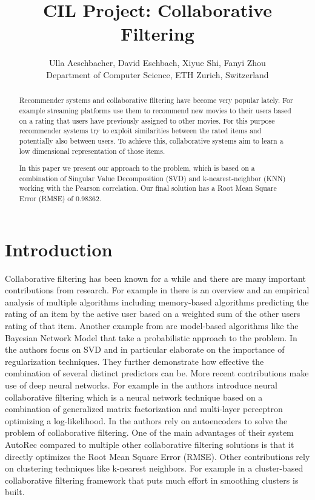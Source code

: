 \documentclass[10pt,conference,compsocconf]{IEEEtran}
\begin{document}
\title{CIL Project: Collaborative Filtering}

\author{
	Ulla Aeschbacher, David Eschbach,  Xiyue Shi, Fanyi Zhou\\
	Department of Computer Science, ETH Zurich, Switzerland
}

\maketitle

\begin{abstract}
Recommender systems and collaborative filtering have become very popular lately. For example streaming platforms use them to recommend new movies to their users based on a rating that users have previously assigned to other movies. For this purpose recommender systems try to exploit similarities between the rated items and potentially also between users. To achieve this, collaborative systems aim to learn a low dimensional representation of those items.

In this paper we present our approach to the problem, which is based on a combination of Singular Value Decomposition (SVD) and k-nearest-neighbor (KNN) working with the Pearson correlation. Our final solution has a Root Mean Square Error (RMSE) of 0.98362.
\end{abstract}

\section{Introduction}
Collaborative filtering has been known for a while and there are many important contributions from research. For example in \cite{breese} there is an overview and an empirical analysis of multiple algorithms including memory-based algorithms predicting the rating of an item by the active user based on a weighted sum of the other users rating of that item. Another example from \cite{breese} are model-based algorithms like the Bayesian Network Model that take a probabilistic approach to the problem. In \cite{paterek} the authors focus on SVD and in particular elaborate on the importance of regularization techniques. They further demonstrate how effective the combination of several distinct predictors can be. More recent contributions make use of deep neural networks. For example in \cite{he} the authors introduce neural collaborative filtering which is a neural network technique based on a combination of generalized matrix factorization and multi-layer perceptron optimizing a log-likelihood. In \cite{sedhain} the authors rely on autoencoders to solve the problem of collaborative filtering. One of the main advantages of their system AutoRec compared to multiple other collaborative filtering solutions is that it directly optimizes the Root Mean Square Error (RMSE). Other contributions rely on clustering techniques like k-nearest neighbors. For example in \cite{xue} a cluster-based collaborative filtering framework that puts much effort in smoothing clusters is built.
\end{document}
